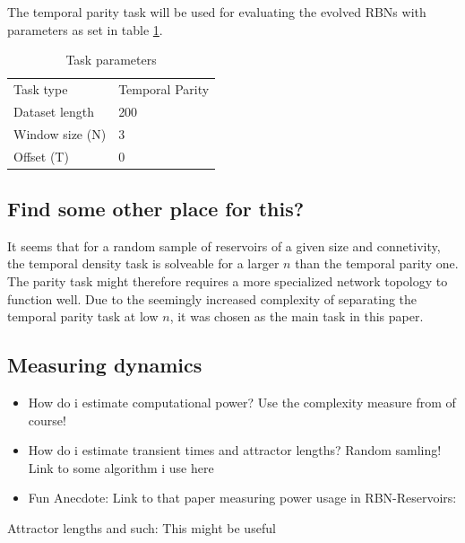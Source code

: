 The temporal parity task will be used for evaluating the evolved RBNs with parameters as set in table \ref{table:dataset-parameters}.

\begin{table}
  \centering
  \caption{Task parameters}
  \label{table:dataset-parameters}
  \begin{tabular}{ll}
    Task type       & Temporal Parity \\
    Dataset length  & 200             \\
    Window size (N) & 3               \\
    Offset (T)      & 0               \\
  \end{tabular}
\end{table}

\subsection{Find some other place for this?}

It seems that for a random sample of reservoirs of a given size and connetivity,
the temporal density task is solveable for a larger $ n $ than the temporal parity one.
The parity task might therefore requires a more specialized network topology to function well.
Due to the seemingly increased complexity of separating the temporal parity task at low $ n $,
it was chosen as the main task in this paper.

\subsection{Measuring dynamics}

\begin{itemize}
  \item
    How do i estimate computational power?
    Use the complexity measure from \cite{rbn-reservoir} of course!
  \item
    How do i estimate transient times and attractor lengths?
    Random samling! Link to some algorithm i use here
  \item
    Fun Anecdote: Link to that paper measuring power usage in RBN-Reservoirs:
    \cite{rbn-reservoir-energy-efficiency}
\end{itemize}

Attractor lengths and such: This might be useful \cite{berdahl2009random}


